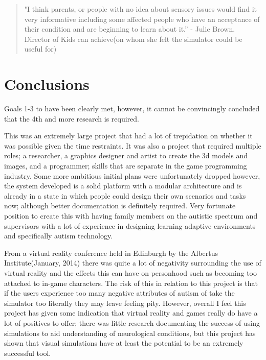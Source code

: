 \documentclass[11pt]{report}
\begin{document}
\begin{quote}
"I think parents, or people with no idea about sensory issues would find it very informative including some affected people who have an acceptance of their condition and are beginning to learn about it.” - Julie Brown. Director of Kids can achieve(on whom she felt the simulator could be useful for) 
\end{quote}

\section{Conclusions}
Goals 1-3 to have been clearly met, however, it cannot be convincingly concluded that the 4th and more research is required. 

This was an extremely large project that had a lot of trepidation on whether it was possible given the time restraints. It was also a project that required multiple roles; a researcher, a graphics designer and artist to create the 3d models and images, and a programmer; skills that are separate in the game programming industry. Some more ambitious initial plans were unfortunately dropped however, the system developed is a solid platform with a modular architecture and is already in a state in which people could design their own scenarios and tasks now; although better documentation is definitely required. Very fortunate position to create this with having family members on the autistic spectrum and supervisors with a lot of experience in designing learning adaptive environments and specifically autism technology.

From a virtual reality conference held in Edinburgh by the Albertus Institute(January, 2014) there was quite a lot of negativity surrounding the use of virtual reality and the effects this can have on personhood such as becoming too attached to in-game characters. The risk of this in relation to this project is that if the users experience too many negative attributes of autism of take the simulator too literally they may leave feeling pity. However, overall I feel this project has given some indication that virtual reality and games really do have a lot of positives to offer; there was little research documenting the success of using simulations to aid understanding of neurological conditions, but this project has shown that visual simulations have at least the potential to be an extremely successful tool.


%

 


\end{document}
